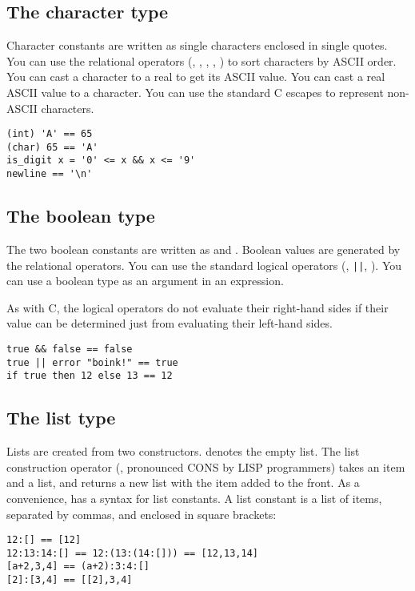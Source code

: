 \subsection{The character type}

Character constants are written as single characters enclosed in single
quotes. You can use the relational operators (\ct{<}, \ct{<=}, \ct{>},
\ct{>=}, \ct{==}) to sort characters by ASCII order. You can cast a
character to a real to get its ASCII value. You can cast a real ASCII value 
to a character. You can use the standard C escapes to represent non-ASCII
characters.

\begin{verbatim}
(int) 'A' == 65
(char) 65 == 'A'
is_digit x = '0' <= x && x <= '9'
newline == '\n' 
\end{verbatim}

\subsection{The boolean type}

The two boolean constants are written as  and . Boolean
values are generated by the relational operators.  You can use the standard
logical operators (\ct{\&\&}, \verb+||+, \ct{!}). You can use a boolean type
as an argument in an  expression.

As with C, the logical operators do not evaluate their right-hand sides if
their value can be determined just from evaluating their left-hand sides.

\begin{verbatim}
true && false == false
true || error "boink!" == true
if true then 12 else 13 == 12
\end{verbatim}

\subsection{The list type}

Lists are created from two constructors. \ct{[]} denotes the empty list. The
list construction operator (\ct{:}, pronounced CONS by LISP programmers) takes
an item and a list, and returns a new list with the item added to the front.
As a convenience, \nip{} has a syntax for list constants. A list constant is a
list of items, separated by commas, and enclosed in square brackets:

\begin{verbatim}
12:[] == [12]
12:13:14:[] == 12:(13:(14:[])) == [12,13,14]
[a+2,3,4] == (a+2):3:4:[]
[2]:[3,4] == [[2],3,4]
\end{verbatim}

